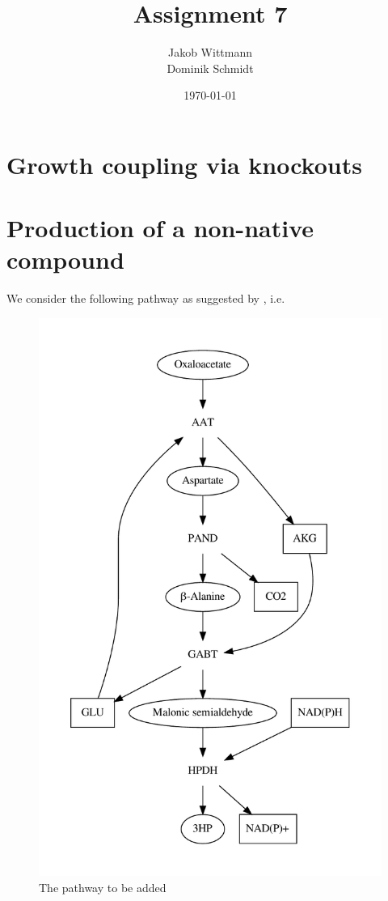 \documentclass{scrartcl}
\title{Assignment 7}
\author{Jakob Wittmann\\Dominik Schmidt}
\date{\today}
\begin{document}
\maketitle
\section{Growth coupling via knockouts}
\section{Production of a non-native compound}
	We consider the following pathway as suggested by \cite{BORODINA201557}, i.e. 
	\begin{figure}[h]
		\centering
		\includegraphics[max width=\linewidth, max height=0.74\paperheight]{2/new_pathway.pdf}
		\caption{The pathway to be added}
	\end{figure}
\end{document}
